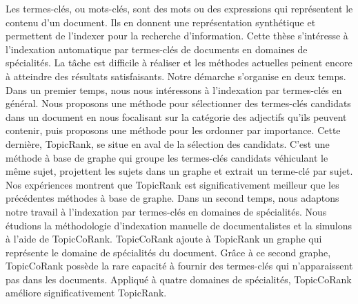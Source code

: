 Les termes-clés, ou mots-clés, sont des mots ou des expressions qui représentent
le contenu d'un document. Ils en donnent une représentation synthétique et
permettent de l'indexer pour la recherche d'information. Cette thèse s'intéresse
à l'indexation automatique par termes-clés de documents en domaines de
spécialités. La tâche est difficile à réaliser et les méthodes actuelles peinent
encore à atteindre des résultats satisfaisants. Notre démarche s'organise en
deux temps. Dans un premier temps, nous nous intéressons à l'indexation par
termes-clés en général. Nous proposons une méthode pour sélectionner des
termes-clés candidats dans un document en nous focalisant sur la catégorie des
adjectifs qu'ils peuvent contenir, puis proposons une méthode pour les ordonner
par importance. Cette dernière, TopicRank, se situe en aval de la sélection des
candidats. C'est une méthode à base de graphe qui groupe les termes-clés
candidats véhiculant le même sujet, projettent les sujets dans un graphe et
extrait un terme-clé par sujet. Nos expériences montrent que TopicRank est
significativement meilleur que les précédentes méthodes à base de graphe. Dans
un second temps, nous adaptons notre travail à l'indexation par termes-clés en
domaines de spécialités. Nous étudions la méthodologie d'indexation manuelle de
documentalistes et la simulons à l'aide de TopicCoRank. TopicCoRank ajoute à
TopicRank un graphe qui représente le domaine de spécialités du document. Grâce
à ce second graphe, TopicCoRank possède la rare capacité à fournir des
termes-clés qui n'apparaissent pas dans les documents. Appliqué à quatre
domaines de spécialités, TopicCoRank améliore significativement TopicRank.

